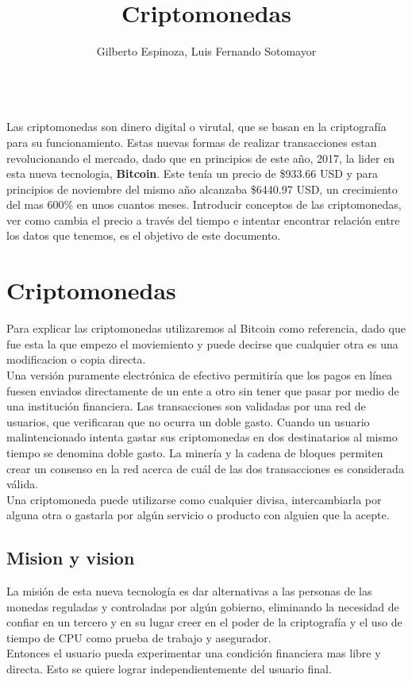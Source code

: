 \documentclass[12pt,letterpaper]{article}
\title{Criptomonedas}
\author{Gilberto Espinoza, Luis Fernando Sotomayor}
\begin{document}
\maketitle
\abstractname{\\Las criptomonedas son dinero digital o virutal, que se basan en la criptograf\'ia para su funcionamiento. Estas nuevas formas de realizar transacciones estan revolucionando el mercado, dado que en principios de este a\~no, 2017, la lider en esta nueva tecnologia, \textbf{Bitcoin}. Este ten\'ia un precio de \$933.66 USD y para principios de noviembre del mismo a\~no alcanzaba \$6440.97 USD, un crecimiento del mas 600\% en unos cuantos meses. Introducir conceptos de las criptomonedas, ver como cambia el precio a trav\'es del tiempo e intentar encontrar relaci\'on entre los datos que tenemos, es el objetivo de este documento.}

\section{Criptomonedas}
Para explicar las criptomonedas utilizaremos al Bitcoin como referencia, dado que fue esta la que empezo el moviemiento y puede decirse que cualquier otra es una modificacion o copia directa.
    \\

	Una versi\'on puramente electr\'onica de efectivo permitir\'ia que los pagos en l\'inea fuesen enviados directamente de un ente a otro sin tener que pasar por medio de una instituci\'on financiera. Las transacciones son validadas por una red de usuarios, que verificaran que no ocurra un doble gasto. Cuando un usuario malintencionado intenta gastar sus criptomonedas en dos destinatarios al mismo tiempo se denomina doble gasto. La miner\'ia y la cadena de bloques permiten crear un consenso en la red acerca de cu\'al de las dos transacciones es considerada v\'alida.
    \\
	
	Una criptomoneda puede utilizarse como cualquier divisa, intercambiarla por alguna otra o gastarla por alg\'un servicio o producto con alguien que la acepte.
	\subsection*{Mision y vision}
	La misi\'on de esta nueva tecnolog\'ia es dar alternativas a las personas de las monedas reguladas y controladas por alg\'un gobierno, eliminando la necesidad de confiar en un tercero y en su lugar creer en el poder de la criptograf\'ia y el uso de tiempo de CPU como prueba de trabajo y asegurador. \\
    Entonces el usuario pueda experimentar una condici\'on financiera mas libre y directa. Esto se quiere lograr independientemente del usuario final.
    \\
	
\end{document}
